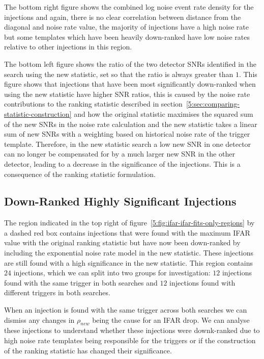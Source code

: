 The bottom right figure shows the combined log noise event rate density for the injections and again, there is no clear correlation between distance from the diagonal and noise rate value, the majority of injections have a high noise rate but some templates which have been heavily down-ranked have low noise rates relative to other injections in this region.

The bottom left figure shows the ratio of the two detector SNRs identified in the search using the new statistic, set so that the ratio is always greater than $1$. This figure shows that injections that have been most significantly down-ranked when using the new statistic have higher SNR ratios, this is caused by the noise rate contributions to the ranking statistic described in section~\ref{5:sec:comparing-statistic-construction} and how the original statistic maximises the squared sum of the new SNRs in the noise rate calculation and the new statistic takes a linear sum of new SNRs with a weighting based on historical noise rate of the trigger template. Therefore, in the new statistic search a low new SNR in one detector can no longer be compensated for by a much larger new SNR in the other detector, leading to a decrease in the significance of the injections. This is a consequence of the ranking statistic formulation.

\subsection{\label{5:sec:top-right-region}Down-Ranked Highly Significant Injections}

The region indicated in the top right of figure~\ref{5:fig:ifar-ifar-fits-only-regions} by a dashed red box contains injections that were found with the maximum IFAR value with the original ranking statistic but have now been down-ranked by including the exponential noise rate model in the new statistic. These injections are still found with a high significance in the new statistic. This region contains $24$ injections, which we can split into two groups for investigation: $12$ injections found with the same trigger in both searches and $12$ injections found with different triggers in both searches. 

When an injection is found with the same trigger across both searches we can dismiss any changes in $\rho_{new}$ being the cause for an IFAR drop. We can analyse these injections to understand whether these injections were downk-ranked due to high noise rate templates being responsible for the triggers or if the construction of the ranking statistic has changed their significance.


